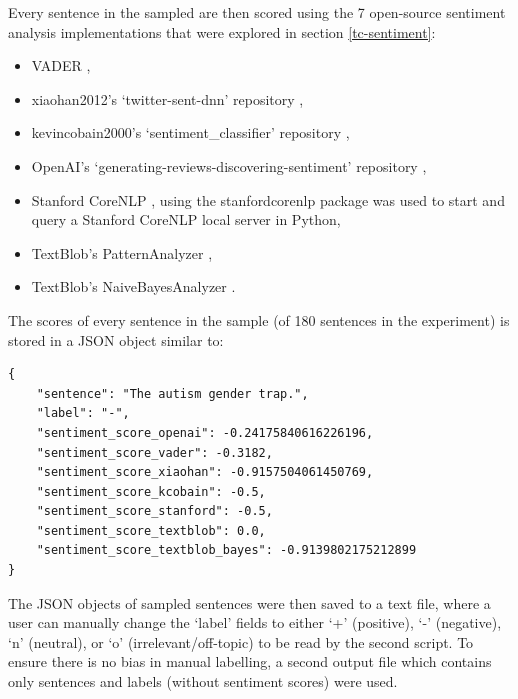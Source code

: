 \documentclass{report}
\begin{document}
Every sentence in the sampled are then scored using the 7 open-source sentiment analysis implementations that were explored in section \ref{tc-sentiment}:
\begin{itemize}
	\item VADER \cite{VADER},
	\item xiaohan2012's `twitter-sent-dnn' repository \cite{kalchbrennerACL2014},
	\item kevincobain2000's `sentiment\_classifier' repository \cite{kevincobain},
	\item OpenAI's `generating-reviews-discovering-sentiment' repository \cite{OpenAI},
	\item Stanford CoreNLP \cite{StanfordNLP}, using the stanfordcorenlp package \cite{stanfordcorenlp} was used to start and query a Stanford CoreNLP local server in Python,
	\item TextBlob's PatternAnalyzer \cite{textblob},
	\item TextBlob's NaiveBayesAnalyzer \cite{textblob}.
\end{itemize}

The scores of every sentence in the sample (of 180 sentences in the experiment) is stored in a JSON object similar to:
\begin{lstlisting}
{
	"sentence": "The autism gender trap.",
	"label": "-",
	"sentiment_score_openai": -0.24175840616226196,
	"sentiment_score_vader": -0.3182,
	"sentiment_score_xiaohan": -0.9157504061450769,
	"sentiment_score_kcobain": -0.5,
	"sentiment_score_stanford": -0.5,
	"sentiment_score_textblob": 0.0,
	"sentiment_score_textblob_bayes": -0.9139802175212899
}
\end{lstlisting}

The JSON objects of sampled sentences were then saved to a text file, where a user can manually change the `label' fields to either `+' (positive), `-' (negative), `n' (neutral), or `o' (irrelevant/off-topic) to be read by the second script.
To ensure there is no bias in manual labelling, a second output file which contains only sentences and labels (without sentiment scores) were used.
\end{document}
